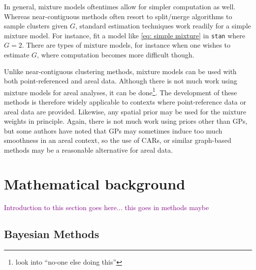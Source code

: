 \documentclass[twoside,12pt,bibstyle=chem-acs]{reedthesis}
\begin{document}
In general, mixture models oftentimes allow for simpler computation as well. Whereas near-contiguous methods often resort to split/merge algorithms to sample clusters given $G$, standard estimation techniques work readily for a simple mixture model. For instance, \citeauthor{gardini_mixture--experts_2025} fit a model like \autoref{eq: simple mixture} in \texttt{stan} \cite{guo_rstan_2015} where $G = 2$. There are types of mixture models, for instance when one wishes to estimate $G$, where computation becomes more difficult though.


Unlike near-contiguous clustering methods, mixture models can be used with both point-referenced and areal data. Although there is not much work using mixture models for areal analyses, it can be done\footnote{look into ``no-one else doing this''}. The development of these methods is therefore widely applicable to contexts where point-reference data or areal data are provided. Likewise, any spatial prior may be used for the mixture weights in principle. Again, there is not much work using priors other than GPs, but some authors \cite{balocchi_crime_2023} have noted that GPs may sometimes induce too much smoothness in an areal context, so the use of CARs, or similar graph-based methods may be a reasonable alternative for areal data.


\section{Mathematical background}
\label{sec: math background}
\textcolor{purple}{Introduction to this section goes here... this goes in methods maybe}

\subsection{Bayesian Methods}
\label{sbsc: bayesian intro}
\end{document}
